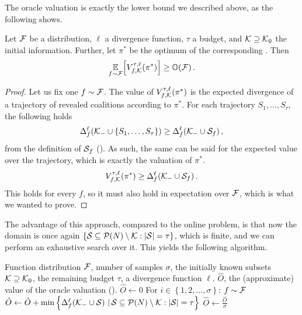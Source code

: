 The oracle valuation is exactly the lower bound we described above, as the following  shows.

\begin{prop}
  \label{thm:online-bound-oracle}
  Let $ \mathcal{F} $ be a distribution, $ \ell $ a divergence function, $ \tau $ a budget, and $ \mathcal{K} \supseteq \mathcal{K}_0 $ the initial information.
  Further, let $ \pi^* $ be the optimum of the corresponding .
  Then \[
    \operatorname*{\mathbb{E}}_{f \sim \mathcal{F}}\!\left[ V^{\tau,\ell}_{f,\mathcal{K}}\!\left(\pi^*\right) \right] \geq \mathbb O\!\left(\mathcal{F}\right).
  \]
\end{prop}

\begin{proof}
  Let us fix one $ f \sim \mathcal{F} $.
  The value of $ V^{\tau,\ell}_{f,\mathcal{K}}\!\left(\pi^*\right) $ is the expected divergence of a trajectory of revealed coalitions according to $ \pi^* $.
  For each trajectory $ S_1, \ldots, S_\tau $, the following holds \[
    \Delta_{f}^{\ell}\!\left(\mathcal{K}_- \cup \left\{ S_1, \ldots, S_\tau \right\}\right) \geq \Delta_{f}^{\ell}\!\left(\mathcal{K}_- \cup \mathcal{S}_f\right),
  \]
  from the definition of $ \mathcal{S}_f $ ().
  As such, the same can be said for the expected value over the trajectory, which is exactly the valuation of $ \pi^* $. \[
    V^{\tau,\ell}_{f,\mathcal{K}}\!\left(\pi^*\right) \geq \Delta_{f}^{\ell}\!\left(\mathcal{K}_- \cup \mathcal{S}_f\right).
  \]
  This holds for every $ f $, so it must also hold in expectation over $ \mathcal{F} $, which is what we wanted to prove.
\end{proof}

The advantage of this approach, compared to the online problem, is that now the domain is once again $ \left\{ \mathcal{S} \subseteq \mathcal{P}\!\left(N\right) \setminus \mathcal{K}: \left\lvert \mathcal{S} \right\rvert = \tau \right\} $, which is finite, and we can perform an exhaustive search over it.
This yields the following algorithm.

\begin{algor}{\algRO{}}{Function distribution $ \mathcal{F} $, number of samples $ \sigma $, the initially known subsets $ \mathcal{K} \supseteq \mathcal{K}_0 $, the remaining budget $ \tau $, a divergence function $ \ell $.}
  {$ \hat O $, the (approximate) value of the oracle valuation ().}
  \State $ \hat O \gets 0 $
  \Indent For $ i \in \left\{ 1, 2, \ldots, \sigma \right\} $:
    \State $ f \sim \mathcal{F} $
    \State $ \hat O \gets \hat O + \min \left\{ \Delta_{f}^{\ell}\!\left(\mathcal{K}_- \cup \mathcal{S}\right)  \,|\, \mathcal{S} \subseteq \mathcal{P}\!\left(N\right) \setminus \mathcal{K}: \left\lvert \mathcal{S} \right\rvert = \tau \right\} $
  \EndIndent
  \State $ \hat O \gets \frac{\hat O}{\sigma} $
\end{algor}

